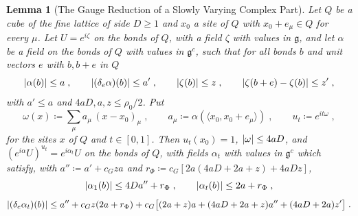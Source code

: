 \documentclass[11pt]{preprint}
\DeclarePairedDelimiter{\abs}{\lvert}{\rvert}
\numberwithin{equation}{section}
\newtheorem{lemma}[theorem]{Lemma}
\theoremstyle{definition}
\theoremstyle{remark}
\theoremstyle{plain}
\begin{document}
\begin{lemma}[The Gauge Reduction of a Slowly Varying Complex Part]\label{lem:gauge-reduction}
Let $Q$ be a cube of the fine lattice of side $D \geq 1$ and $x_0$ a site of $Q$ with $x_0 + e_\mu \in Q$ for every $\mu$. Let $U = e^{i\zeta}$ on the bonds of $Q$, with a field $\zeta$ with values in $\mathfrak g$, and let $\alpha$ be a field on the bonds of $Q$ with values in $\mathfrak g^c$, such that for all bonds $b$ and unit vectors $e$ with $b, b + e$ in $Q$
\begin{equation}\label{eq:reduction-hypotheses}
    \abs{\alpha(b)} \leq a\;,
    \qquad
    \abs{(\delta_e\alpha)(b)} \leq a'\;,
    \qquad
    \abs{\zeta(b)} \leq z\;,
    \qquad
    \abs{\zeta(b + e) - \zeta(b)} \leq z'\;,
\end{equation}
with $a' \leq a$ and $4aD, a, z \leq \rho_0/2$. Put
\begin{equation}\label{eq:gauge-function}
    \omega(x) \coloneqq \sum_\mu a_\mu\,(x - x_0)_\mu\;,
    \qquad
    a_\mu \coloneqq \alpha(\langle x_0, x_0 + e_\mu\rangle)\;,
    \qquad
    u_t \coloneqq e^{it\omega}\;,
\end{equation}
for the sites $x$ of $Q$ and $t \in [0, 1]$. Then $u_t(x_0) = 1$, $\abs{\omega} \leq 4aD$, and $(e^{i\alpha}U)^{u_t} = e^{i\alpha_t}U$ on the bonds of $Q$, with fields $\alpha_t$ with values in $\mathfrak g^c$ which satisfy, with $a'' \coloneqq a' + c_Gza$ and $r_\Phi \coloneqq c_G[2a(4aD + 2a + z) + 4aDz]$,
\begin{equation}\label{eq:reduced-phase}
    \abs{\alpha_1(b)} \leq 4Da'' + r_\Phi\;,
    \qquad
    \abs{\alpha_t(b)} \leq 2a + r_\Phi\;,
\end{equation}
\begin{equation}\label{eq:reduced-difference}
    \abs{(\delta_e\alpha_t)(b)} \leq a'' + c_Gz(2a + r_\Phi) + c_G\bigl[(2a + z)a + (4aD + 2a + z)a'' + (4aD + 2a)z'\bigr]\;.
\end{equation}
\end{lemma}
\end{document}
